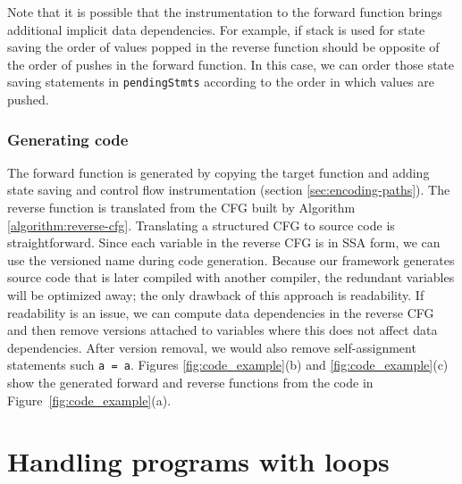 \documentclass[12pt]{gatech-thesis}
\begin{document}
Note that it is possible that the instrumentation to the forward function brings additional implicit data dependencies. 
For example, if stack is used for state saving the order of values popped in the reverse function should be opposite of the order of pushes in the forward function. 
In this case, we can order those state saving statements in \texttt{pendingStmts} according to the order in which values are pushed.


\subsubsection{Generating code} 
The forward function is generated by copying the target function and adding state saving and control flow instrumentation (section \ref{sec:encoding-paths}). 
The reverse function is translated from the CFG built by Algorithm \ref{algorithm:reverse-cfg}. 
Translating a structured CFG to source code is straightforward. 
Since each variable in the reverse CFG is in SSA form, we can use the versioned name during code generation. 
Because our framework generates source code that is later compiled with another compiler, the redundant variables will be optimized away; the only drawback of this approach is readability.
If readability is an issue, we can compute data dependencies in the reverse CFG and then remove versions attached to variables where this does not affect data dependencies.
After version removal, we would also remove self-assignment statements such \texttt{a = a}.
Figures \ref{fig:code_example}(b) and \ref{fig:code_example}(c) show the generated forward and reverse functions from the code in Figure~\ref{fig:code_example}(a).








\section{Handling programs with loops}





\newcommand{\pVSG}{\ensuremath{G_P}\xspace}
\newcommand{\lVSG}{\ensuremath{G_L}\xspace}
\end{document}
